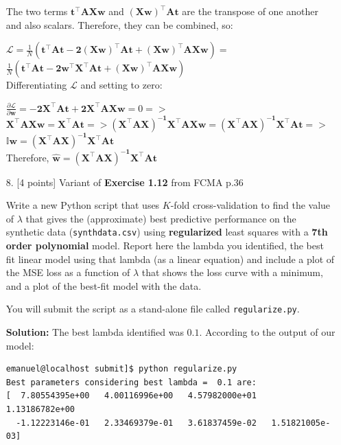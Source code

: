 \documentclass[10pt]{article}
\begin{document}
\begin{itemize}
The two terms $\mathbf{t^{\top}AXw}$ and $\mathbf{(Xw)^{\top}At}$ are the transpose of one another and also scalars. Therefore, 
they can be combined, so:

$\mathcal{L}= \frac{1}{N}(\mathbf{t^{\top}At - 2(Xw)^{\top}At + (Xw)^{\top}AXw}) = $ \\
$ \frac{1}{N}(\mathbf{t^{\top}At - 2w^{\top}X^{\top}At + (Xw)^{\top}AXw}) $ \\

Differentiating $\mathcal{L}$ and setting to zero:

$\frac{\partial \mathcal{L}}{\partial \mathbf{w}} = \mathbf{-2X^{\top}At + 2X^{\top}AXw} = 0 =>$ \\
$\mathbf{X^{\top}AXw = X^{\top}At } => \mathbf{(X^{\top}AX)^{-1} X^{\top}AXw = (X^{\top}AX)^{-1} X^{\top}At } =>$  \\
$\mathbf{\mathbb{I} w = (X^{\top}AX)^{-1} X^{\top}At }$ \\[0.5 cm]

Therefore, $\mathbf{ \hat{w} = (X^{\top}AX)^{-1} X^{\top}At }$








\item[8.] [4 points]
Variant of {\bf Exercise 1.12} from FCMA p.36

Write a new Python script that uses $K$-fold cross-validation to find the value of $\lambda$ that gives the (approximate) best predictive performance on the synthetic data ({\tt synthdata.csv}) using {\bf regularized} least squares with a {\bf 7th order polynomial} model.  Report here the lambda you identified, the best fit linear model using that lambda (as a linear equation) and include a plot of the MSE loss as a function of $\lambda$ that shows the loss curve with a minimum, and a plot of the best-fit model with the data.

You will submit the script as a stand-alone file called {\tt regularize.py}.

{\bf Solution:} The best lambda identified was $0.1$. According to the output of our model:

\begin{verbatim}
emanuel@localhost submit]$ python regularize.py 
Best parameters considering best lambda =  0.1 are: 
[  7.80554395e+00   4.00116996e+00   4.57982000e+01   1.13186782e+00
  -1.12223146e-01   2.33469379e-01   3.61837459e-02   1.51821005e-03]

\end{verbatim} 


\end{itemize}
\end{document}

